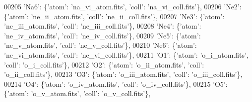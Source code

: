 \begin{DoxyCode}
00205                             \textcolor{stringliteral}{'Na6'}: \{\textcolor{stringliteral}{'atom'}: \textcolor{stringliteral}{'na\_vi\_atom.fits'}, \textcolor{stringliteral}{'coll'}: \textcolor{stringliteral}{'na\_vi\_coll.fits'}\},
00206                             \textcolor{stringliteral}{'Ne2'}: \{\textcolor{stringliteral}{'atom'}: \textcolor{stringliteral}{'ne\_ii\_atom.fits'}, \textcolor{stringliteral}{'coll'}: \textcolor{stringliteral}{'ne\_ii\_coll.fits'}\},
00207                             \textcolor{stringliteral}{'Ne3'}: \{\textcolor{stringliteral}{'atom'}: \textcolor{stringliteral}{'ne\_iii\_atom.fits'}, \textcolor{stringliteral}{'coll'}: \textcolor{stringliteral}{'ne\_iii\_coll.fits'}\},
00208                             \textcolor{stringliteral}{'Ne4'}: \{\textcolor{stringliteral}{'atom'}: \textcolor{stringliteral}{'ne\_iv\_atom.fits'}, \textcolor{stringliteral}{'coll'}: \textcolor{stringliteral}{'ne\_iv\_coll.fits'}\},
00209                             \textcolor{stringliteral}{'Ne5'}: \{\textcolor{stringliteral}{'atom'}: \textcolor{stringliteral}{'ne\_v\_atom.fits'}, \textcolor{stringliteral}{'coll'}: \textcolor{stringliteral}{'ne\_v\_coll.fits'}\},
00210                             \textcolor{stringliteral}{'Ne6'}: \{\textcolor{stringliteral}{'atom'}: \textcolor{stringliteral}{'ne\_vi\_atom.fits'}, \textcolor{stringliteral}{'coll'}: \textcolor{stringliteral}{'ne\_vi\_coll.fits'}\},
00211                             \textcolor{stringliteral}{'O1'}: \{\textcolor{stringliteral}{'atom'}: \textcolor{stringliteral}{'o\_i\_atom.fits'}, \textcolor{stringliteral}{'coll'}: \textcolor{stringliteral}{'o\_i\_coll.fits'}\},
00212                             \textcolor{stringliteral}{'O2'}: \{\textcolor{stringliteral}{'atom'}: \textcolor{stringliteral}{'o\_ii\_atom.fits'}, \textcolor{stringliteral}{'coll'}: \textcolor{stringliteral}{'o\_ii\_coll.fits'}\},
00213                             \textcolor{stringliteral}{'O3'}: \{\textcolor{stringliteral}{'atom'}: \textcolor{stringliteral}{'o\_iii\_atom.fits'}, \textcolor{stringliteral}{'coll'}: \textcolor{stringliteral}{'o\_iii\_coll.fits'}\},
00214                             \textcolor{stringliteral}{'O4'}: \{\textcolor{stringliteral}{'atom'}: \textcolor{stringliteral}{'o\_iv\_atom.fits'}, \textcolor{stringliteral}{'coll'}: \textcolor{stringliteral}{'o\_iv\_coll.fits'}\},
00215                             \textcolor{stringliteral}{'O5'}: \{\textcolor{stringliteral}{'atom'}: \textcolor{stringliteral}{'o\_v\_atom.fits'}, \textcolor{stringliteral}{'coll'}: \textcolor{stringliteral}{'o\_v\_coll.fits'}\},

\end{DoxyCode}
